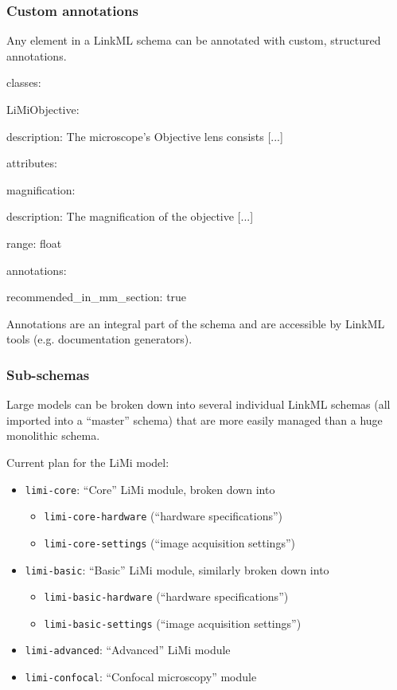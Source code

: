 \begin{frame}
  \frametitle{Custom annotations}

  Any element in a LinkML schema can be annotated with custom,
  structured annotations.

\begin{semiverbatim}
classes:

\hspace{1em}LiMiObjective:

\hspace{2em}description: The microscope's Objective lens consists [...]

\hspace{2em}attributes:

\hspace{3em}magnification:

\hspace{4em}description: The magnification of the objective [...]

\hspace{4em}range: float

\hspace{4em}annotations:

\hspace{5em}recommended\_in\_mm\_section: true
\end{semiverbatim}

  Annotations are an integral part of the schema and are
  accessible by LinkML tools (e.g. documentation generators).

\end{frame}

\begin{frame}
  \frametitle{Sub-schemas}

  Large models can be broken down into several individual LinkML schemas
  (all imported into a ``master'' schema) that are more easily managed 
  than a huge monolithic schema.

  \bigskip
  Current plan for the LiMi model:
  \begin{itemize}
    \item \texttt{limi-core}: ``Core'' LiMi module, broken down into
      \begin{itemize}
        \item \texttt{limi-core-hardware} (``hardware specifications'')
        \item \texttt{limi-core-settings} (``image acquisition settings'')
      \end{itemize}
    \item \texttt{limi-basic}: ``Basic'' LiMi module, similarly broken down into
      \begin{itemize}
        \item \texttt{limi-basic-hardware} (``hardware specifications'')
        \item \texttt{limi-basic-settings} (``image acquisition settings'')
      \end{itemize}
    \item \texttt{limi-advanced}: ``Advanced'' LiMi module
    \item \texttt{limi-confocal}: ``Confocal microscopy'' module
  \end{itemize}
\end{frame}

